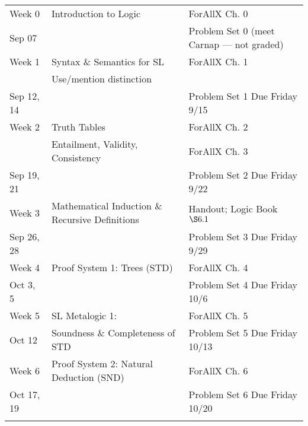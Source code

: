 \documentclass[letterpaper]{inzane_syllabus} %
\begin{document}
\begin{center}
\begin{tabularx}{\textwidth}{p{2.5cm}p{8cm}p{9cm}} %
\arrayrulecolor{myCOLOR}\hline
\multicolumn{3}{l}{\textbf{\textcolor{myCOLOR}{\large Part 1: Sentential Logic}}} \\
\hline

Week 0 & Introduction to Logic & ForAllX Ch. 0 \\
Sep 07 & & Problem Set 0 (meet Carnap --- not graded)\\
\arrayrulecolor{maingray}\hline

Week 1 & Syntax \& Semantics for SL & ForAllX Ch. 1\\
& Use/mention distinction & \\
Sep 12, 14 & & Problem Set 1 Due Friday 9/15  \\
\arrayrulecolor{maingray}\hline

Week 2 & Truth Tables & ForAllX Ch. 2 \\
& Entailment, Validity, Consistency & ForAllX Ch. 3 \\
Sep 19, 21 & & Problem Set 2 Due Friday 9/22 \\
\arrayrulecolor{maingray}\hline

Week 3 & Mathematical Induction \& Recursive Definitions & Handout; Logic Book $\S6.1$\\
Sep 26, 28 & & Problem Set 3 Due Friday 9/29 \\
\arrayrulecolor{maingray}\hline

Week 4 & Proof System 1: Trees (STD) & ForAllX Ch. 4 \\
Oct 3, 5 & & Problem Set 4 Due Friday 10/6\\
\arrayrulecolor{maingray}\hline

Week 5 & SL Metalogic 1: & ForAllX Ch. 5 \\
Oct 12 & Soundness \& Completeness of STD & Problem Set 5 Due Friday 10/13 \\
\arrayrulecolor{maingray}\hline

Week 6 & Proof System 2: Natural Deduction (SND) & ForAllX Ch. 6 \\
Oct 17, 19 & &  Problem Set 6 Due Friday 10/20\\
\arrayrulecolor{myCOLOR}\hline


\end{tabularx}
\end{center}
\end{document}
